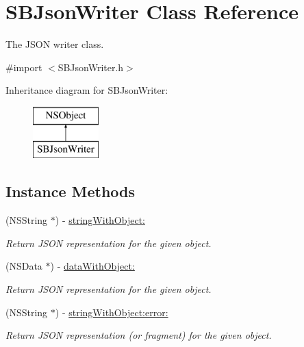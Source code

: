 \hypertarget{interface_s_b_json_writer}{\section{S\-B\-Json\-Writer Class Reference}
\label{interface_s_b_json_writer}
}


The J\-S\-O\-N writer class.  




{\ttfamily \#import $<$S\-B\-Json\-Writer.\-h$>$}

Inheritance diagram for S\-B\-Json\-Writer\-:\begin{figure}[H]
\begin{center}
\leavevmode
\includegraphics[height=2.000000cm]{interface_s_b_json_writer}
\end{center}
\end{figure}
\subsection*{Instance Methods}
\begin{DoxyCompactItemize}
\item 
(N\-S\-String $\ast$) -\/ \hyperlink{interface_s_b_json_writer_a9018ceff9753092b310a43782c5083ed}{string\-With\-Object\-:}
\begin{DoxyCompactList}\small\item\em Return J\-S\-O\-N representation for the given object. \end{DoxyCompactList}\item 
(N\-S\-Data $\ast$) -\/ \hyperlink{interface_s_b_json_writer_ad16f43f23b20d93983dae3441675a028}{data\-With\-Object\-:}
\begin{DoxyCompactList}\small\item\em Return J\-S\-O\-N representation for the given object. \end{DoxyCompactList}\item 
(N\-S\-String $\ast$) -\/ \hyperlink{interface_s_b_json_writer_a41cfe2a66c774790785a841633cc0bc4}{string\-With\-Object\-:error\-:}
\begin{DoxyCompactList}\small\item\em Return J\-S\-O\-N representation (or fragment) for the given object. \end{DoxyCompactList}\end{DoxyCompactItemize}
